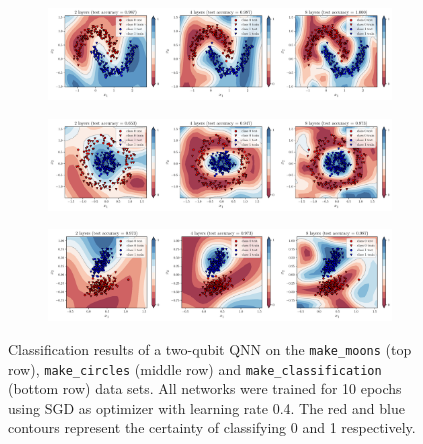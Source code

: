\documentclass[a4paper,10pt]{article}
\begin{document}
\begin{appendices}
\begin{figure}[ht]
	\centering
	\begin{subfigure}{.9458\textwidth}
		\centering
		\includegraphics[width=1\linewidth]{figures/qnn_moons_classification.pdf}
	\end{subfigure}
	\begin{subfigure}{.9458\textwidth}
		\centering
		\includegraphics[width=1\linewidth]{figures/qnn_circles_classification.pdf}
	\end{subfigure}
	\begin{subfigure}{.9458\textwidth}
		\centering
		\includegraphics[width=1\linewidth]{figures/qnn_linear_classification.pdf}
	\end{subfigure}
	\cprotect\caption{Classification results of a two-qubit QNN on the \verb|make_moons| (top row), \verb|make_circles| (middle row) and \verb|make_classification| (bottom row) data sets. All networks were trained for 10 epochs using SGD as optimizer with learning rate 0.4. The red and blue contours represent the certainty of classifying 0 and 1 respectively.}
	\label{fig:classification_decision_regions}
\end{figure}


\end{appendices}
\end{document}
